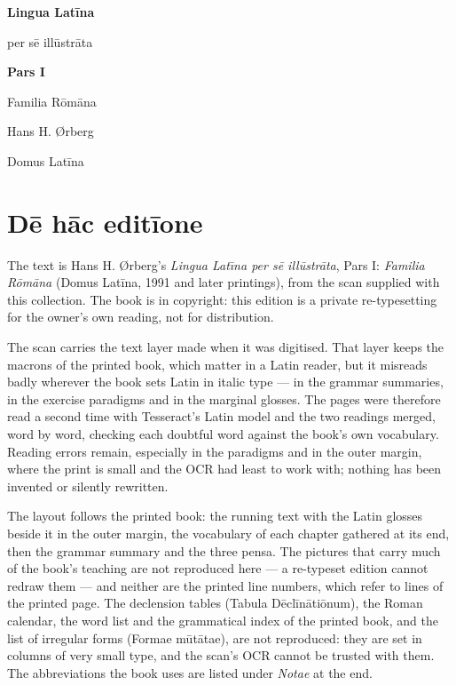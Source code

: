 \documentclass[11pt,openany]{book}
\begin{document}
\begin{titlepage}
\centering
\vspace*{1.5in}
{\sffamily\bfseries\fontsize{30}{36}\selectfont Lingua Latīna\par}
\vspace{0.16in}
{\sffamily\large per sē illūstrāta\par}
\vspace{0.5in}
{\sffamily\bfseries\large Pars I\par}
\vspace{0.14in}
{\sffamily\Large Familia Rōmāna\par}
\vspace{0.6in}
{\sffamily\large Hans H. Ørberg\par}
\vfill
{\sffamily\small Domus Latīna\par}
\end{titlepage}

\pagestyle{fancy}
\chapter*{Dē hāc editīone}

The text is Hans H. \O{}rberg's \emph{Lingua Lat\={\i}na per s\=e ill\=ustr\=ata}, Pars I: \emph{Familia R\=om\=ana} (Domus Lat\=ina, 1991 and later printings), from the scan supplied with this collection. The book is in copyright: this edition is a private re-typesetting for the owner's own reading, not for distribution.

The scan carries the text layer made when it was digitised. That layer keeps the macrons of the printed book, which matter in a Latin reader, but it misreads badly wherever the book sets Latin in italic type --- in the grammar summaries, in the exercise paradigms and in the marginal glosses. The pages were therefore read a second time with Tesseract's Latin model and the two readings merged, word by word, checking each doubtful word against the book's own vocabulary. Reading errors remain, especially in the paradigms and in the outer margin, where the print is small and the OCR had least to work with; nothing has been invented or silently rewritten.

The layout follows the printed book: the running text with the Latin glosses beside it in the outer margin, the vocabulary of each chapter gathered at its end, then the grammar summary and the three pensa. The pictures that carry much of the book's teaching are not reproduced here --- a re-typeset edition cannot redraw them --- and neither are the printed line numbers, which refer to lines of the printed page. The declension tables (Tabula D\=ecl\=in\=ati\=onum), the Roman calendar, the word list and the grammatical index of the printed book, and the list of irregular forms (Formae m\=ut\=atae), are not reproduced: they are set in columns of very small type, and the scan's OCR cannot be trusted with them. The abbreviations the book uses are listed under \emph{Notae} at the end.
\end{document}
